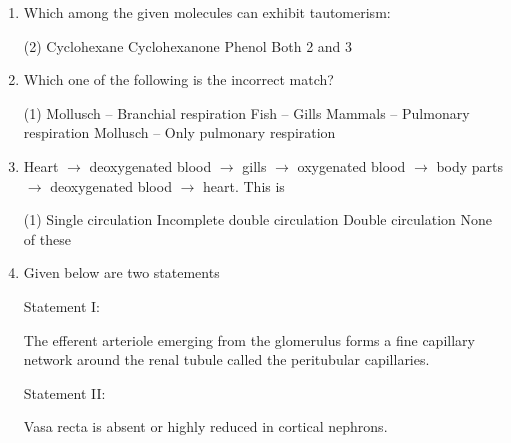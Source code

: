 \documentclass[twocolumn]{article}
\begin{document}
\begin{enumerate}
    \item Which among the given molecules can exhibit tautomerism:

    \begin{center}
    \end{center}

    \begin{tasks}(2)
        \task Cyclohexane
        \task Cyclohexanone
        \task Phenol
        \task Both 2 and 3
    \end{tasks}

    \item Which one of the following is the incorrect match?
    \begin{tasks}(1)
        \task Mollusch – Branchial respiration
        \task Fish – Gills
        \task Mammals – Pulmonary respiration
        \task Mollusch – Only pulmonary respiration
    \end{tasks}
    \item Heart $\rightarrow$ deoxygenated blood $\rightarrow$ gills $\rightarrow$ oxygenated blood $\rightarrow$ body parts $\rightarrow$ deoxygenated blood $\rightarrow$ heart. This is
    \begin{tasks}(1)
        \task Single circulation
        \task Incomplete double circulation
        \task Double circulation
        \task None of these
    \end{tasks}
    \item Given below are two statements
    
    Statement I:
    
    The efferent arteriole emerging from the glomerulus forms a fine capillary network around the renal tubule called the peritubular capillaries.
    
    Statement II:
    
    Vasa recta is absent or highly reduced in cortical nephrons.
    

\end{enumerate}
\end{document}
